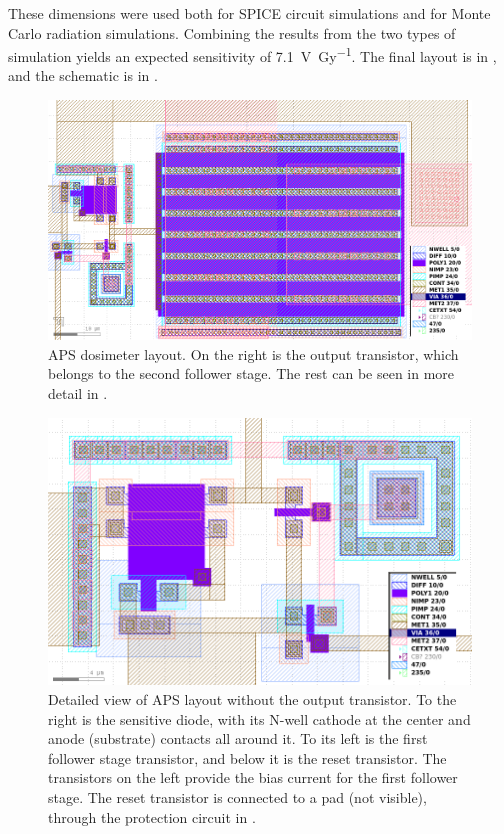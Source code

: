 These dimensions were used both for SPICE circuit simulations and for Monte Carlo radiation simulations.
Combining the results from the two types of simulation yields an expected sensitivity of
\SI{7.1}{\volt\per\gray}.
The final layout is in ,
and the schematic is in .
\begin{figure}[p]
    \centering
    \includegraphics[width=\columnwidth]{figuras/gds/aps/todo.png}
    \caption{APS dosimeter layout.
    On the right is the output transistor, which belongs to the second follower stage.
    The rest can be seen in more detail in .}
    \label{fig:layoutaps}
\end{figure}
\begin{figure}[p]
    \centering
    \includegraphics[width=\columnwidth]{figuras/gds/aps/zoom.png}
    \caption{Detailed view of APS layout without the output transistor.
        To the right is the sensitive diode, with its N-well cathode at the center
        and anode (substrate) contacts all around it.
        To its left is the first follower stage transistor,
        and below it is the reset transistor.
        The transistors on the left provide the bias current for the first follower stage.
        The reset transistor is connected to a pad (not visible),
        through the protection circuit in .}
    \label{fig:layoutapszoom}
\end{figure}
